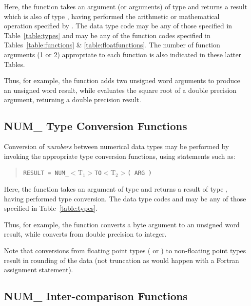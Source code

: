 Here, the  function takes an argument (or arguments) of type
 and returns a result which is also of type ,
having performed the arithmetic or mathematical operation specified by
. 
The data type code  may be any of those specified in
Table~\ref{table:types} and  may be any of the function
codes specified in Tables~\ref{table:functions} \& 
\ref{table:floatfunctions}. 
The number of function arguments (1 or 2) appropriate to each function is
also indicated in these latter Tables. 

Thus, for example, the function  adds two unsigned word
arguments to produce an unsigned word result, while 
evaluates the square root of a double precision argument, returning a double
precision result. 

\subsection{NUM\_ Type Conversion Functions}

Conversion of {\em numbers} between numerical data types may be performed by
invoking the appropriate  type conversion functions, using
statements such as: 

\begin{quote}
\verb#RESULT = NUM_#$<$T$_{1}>$\verb#TO#$<$T$_{2}>$\verb#( ARG )#
\end{quote}

Here, the  function takes an argument of type 
and returns a result of type , having performed type
conversion. 
The data type codes  and  may be any of
those specified in Table~\ref{table:types}. 

Thus, for example, the function  converts a byte argument
to an unsigned word result, while  converts from double
precision to integer. 

Note that conversions from floating point types ( or
) to non-floating point types result in rounding of the data
(not truncation as would happen with a Fortran assignment statement). 

\subsection{NUM\_ Inter-comparison Functions}
\label{section:logicals}

